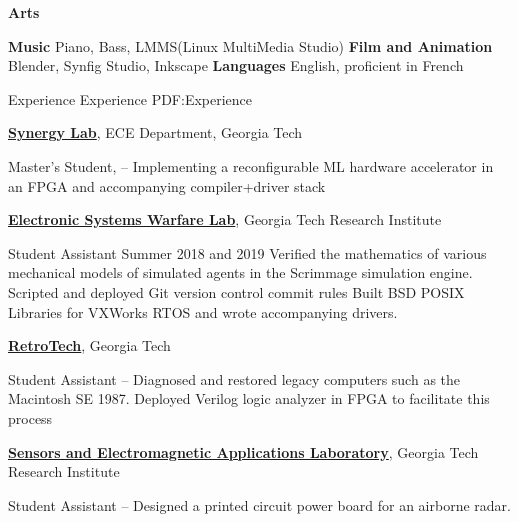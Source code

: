 \documentclass[letterpaper,MMMyyyy,nonstopmode]{simpleresumecv}
\begin{document}
\begin{Body}
\BigGap
\Entry
\textbf{Arts}
\begin{Detail}
\BulletItem
\textbf{Music}
\SubBulletItem
Piano, Bass, LMMS(Linux MultiMedia Studio)
\BulletItem
\textbf{Film and Animation}
\SubBulletItem
Blender, Synfig Studio, Inkscape
\BulletItem
\textbf{Languages}
\SubBulletItem
English, proficient in French
\end{Detail}


\Section
{Experience}
{Experience}
{PDF:Experience}

\Entry
\href{http://synergy.ece.gatech.edu}
{\textbf{Synergy Lab}},
ECE Department, Georgia Tech
\begin{Detail}
\BulletItem
Master's Student,
\hfill
{} --
\SubBulletItem
Implementing a reconfigurable ML hardware accelerator in an FPGA and accompanying compiler+driver stack
\end{Detail}

\Entry
\href{https://www.gtri.gatech.edu/laboratories/electronic-systems-laboratory}
{\textbf{Electronic Systems Warfare Lab}},
Georgia Tech Research Institute
\begin{Detail}
\BulletItem
Student Assistant
\hfill
Summer 2018 and 2019
\SubBulletItem
Verified the mathematics of various mechanical models of simulated agents 
in the Scrimmage simulation engine.
\SubBulletItem
Scripted and deployed Git version control commit rules
\SubBulletItem
Built BSD POSIX Libraries for VXWorks RTOS and wrote accompanying drivers.
\end{Detail}

\Entry
\href{http://retrotech.library.gatech.edu}
{\textbf{RetroTech}},
Georgia Tech
\begin{Detail}
\BulletItem
Student Assistant
\hfill
{} --
\SubBulletItem
Diagnosed and restored legacy computers such as the Macintosh SE 1987. Deployed Verilog logic analyzer in FPGA to facilitate this process
\end{Detail}

\Entry
\href{https://www.gtri.gatech.edu/laboratories/sensors-and-electromagnetic-applications-laboratory}
{\textbf{Sensors and Electromagnetic Applications Laboratory}},
Georgia Tech Research Institute
\begin{Detail}
\BulletItem
Student Assistant
\hfill
{} --
\SubBulletItem
Designed a printed circuit power board for an airborne radar. 
\end{Detail}


\end{Body}
\end{document}
